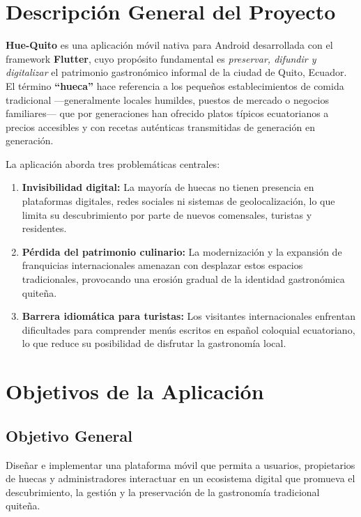 \documentclass[11pt, a4paper, oneside]{report}
\begin{document}
\section{Descripción General del Proyecto}

\textbf{Hue-Quito} es una aplicación móvil nativa para Android desarrollada con el framework \textbf{Flutter}, cuyo propósito fundamental es \textit{preservar, difundir y digitalizar} el patrimonio gastronómico informal de la ciudad de Quito, Ecuador. El término \textbf{``hueca''} hace referencia a los pequeños establecimientos de comida tradicional ---generalmente locales humildes, puestos de mercado o negocios familiares--- que por generaciones han ofrecido platos típicos ecuatorianos a precios accesibles y con recetas auténticas transmitidas de generación en generación.

La aplicación aborda tres problemáticas centrales:

\begin{enumerate}[label=\arabic*.]
  \item \textbf{Invisibilidad digital:} La mayoría de huecas no tienen presencia en plataformas digitales, redes sociales ni sistemas de geolocalización, lo que limita su descubrimiento por parte de nuevos comensales, turistas y residentes.
  \item \textbf{Pérdida del patrimonio culinario:} La modernización y la expansión de franquicias internacionales amenazan con desplazar estos espacios tradicionales, provocando una erosión gradual de la identidad gastronómica quiteña.
  \item \textbf{Barrera idiomática para turistas:} Los visitantes internacionales enfrentan dificultades para comprender menús escritos en español coloquial ecuatoriano, lo que reduce su posibilidad de disfrutar la gastronomía local.
\end{enumerate}

\section{Objetivos de la Aplicación}

\subsection{Objetivo General}
Diseñar e implementar una plataforma móvil que permita a usuarios, propietarios de huecas y administradores interactuar en un ecosistema digital que promueva el descubrimiento, la gestión y la preservación de la gastronomía tradicional quiteña.
\end{document}
